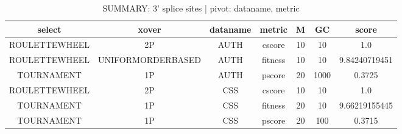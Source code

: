\begin{table}[H]
\centering
\caption{SUMMARY: 3' splice sites | pivot: dataname, metric}
\vspace{5mm}
\begin{adjustbox}{width=1\textwidth}
\begin{tabular}{ |c|c|c|c|c|c|c| }
\hline
select & xover & dataname & metric & M & GC & score\\
\hline
\hline
ROULETTEWHEEL & 2P & AUTH & cscore & 10 & 10 & 1.0\\
\hline
ROULETTEWHEEL & UNIFORMORDERBASED & AUTH & fitness & 10 & 10 & 9.84240719451\\
\hline
TOURNAMENT & 1P & AUTH & pscore & 20 & 1000 & 0.3725\\
\hline
ROULETTEWHEEL & 2P & CSS & cscore & 10 & 10 & 1.0\\
\hline
TOURNAMENT & 1P & CSS & fitness & 20 & 10 & 9.66219155445\\
\hline
TOURNAMENT & 1P & CSS & pscore & 20 & 100 & 0.3715\\
\hline
\end{tabular}
\end{adjustbox}
\label{score3}
\end{table}

